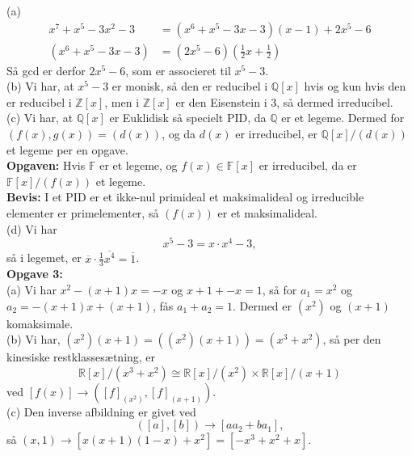 \documentclass[a4paper]{article}
\begin{document}
 (a) 
 \begin{align*}
     x^{7} + x^{5} - 3x^2 -3
     &= (x^{6} + x^{5} - 3x -3)(x -1) + 2 x^{5}  - 6\\
     (x^{6} + x^{5} - 3x -3) 
     &= (2x^{5} - 6) (\frac{1}{2}x  + \frac{1}{2})
 \end{align*}
 Så gcd er derfor  $2x^{5} -6$, som er associeret til $x^{5} - 3$.\\
 (b) Vi har, at $x^{5}-3$ er monisk, så den er reducibel i $\mathbb{Q}[x]$ hvis
 og kun hvis den er reducibel i $\mathbb{Z}[x]$, men i $\mathbb{Z}[x]$ er den
 Eisenstein i  $3$, så dermed irreducibel.\\
 \linebreak
 (c) Vi har, at $\mathbb{Q}[x]$ er Euklidisk så specielt PID, da $\mathbb{Q}$ 
 er et legeme. Dermed for $\left( f(x),g(x) \right) =(d(x))$, og da $d(x)$ er
 irreducibel, er $\mathbb{Q}[x] /\left( d(x) \right) $ et legeme per en
 opgave.\\
 \textbf{Opgaven:} Hvis $\mathbb{F}$ er et legeme, og $f(x) \in \mathbb{F}[x]$ 
 er irreducibel, da er $\mathbb{F}[x]/\left( f(x) \right) $ et legeme.\\
 \textbf{Bevis:} I et PID er et ikke-nul primideal et maksimalideal og
 irreducible elementer er primelementer, så $(f(x))$ er et maksimalideal.\\
 \linebreak
 (d) Vi har 
 \[
 x^{5} -3 = x \cdot x^{4} - 3,
 \] 
 så i legemet, er $\overline{x} \cdot \frac{1}{3} \overline{x^{4}}
 = \overline{1}$.\\
 \linebreak
 \textbf{Opgave 3:}\\
 (a) Vi har $x^2 - (x+1)x = -x$ og $x+1 + -x = 1$, så
 for $a_1= x^2$ og $a_2 = -(x+1) x + (x+1)$, fås $a_1 + a_2 =1$. Dermed er
 $(x^2)$ og $(x+1)$ komaksimale.\\
 \linebreak
 (b) Vi har, $(x^2)(x+1) = \left( (x^2)(x+1) \right) = \left( x^3 + x^2 \right)
 $, så per den kinesiske restklassesætning, er
 \[
     \mathbb{R}[x]/\left( x^3 + x^2 \right) \cong \mathbb{R}[x]/(x^2) \times 
     \mathbb{R}[x]/(x+1)
 \] 
 ved $[f(x)] \to \left( [f]_{(x^2)}, [f]_{(x+1)} \right) $.\\
 \linebreak
 (c) Den inverse afbildning er givet ved
 \[
     ([a],[b]) \to \left[ a a_2 + b a_1 \right],
 \] 
 så $\left( x,1 \right) \to \left[ x (x+1)(1-x) + x^2 \right] = \left[ 
 -x^3 + x^2 + x\right] $.\\
\end{document}
